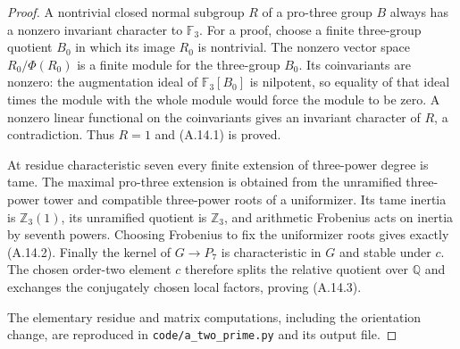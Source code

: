 \begin{proof}
A nontrivial closed normal subgroup $R$ of a pro-three group $B$
always has a nonzero invariant character to $\mathbb F_3$.
For a proof, choose a finite three-group quotient $B_0$ in
which its image $R_0$ is nontrivial. The nonzero vector space
$R_0/\Phi(R_0)$ is a finite module for the three-group $B_0$.
Its coinvariants are nonzero: the augmentation ideal of
$\mathbb F_3[B_0]$ is nilpotent, so equality of that ideal times
the module with the whole module would force the module to be
zero. A nonzero linear functional on the coinvariants gives
an invariant character of $R$, a contradiction. Thus $R=1$
and (A.14.1) is proved.

At residue characteristic seven every finite extension of
three-power degree is tame. The maximal pro-three extension
is obtained from the unramified three-power tower and compatible
three-power roots of a uniformizer. Its tame inertia is
$\mathbb Z_3(1)$, its unramified quotient is $\mathbb Z_3$,
and arithmetic Frobenius acts on inertia by seventh powers.
Choosing Frobenius to fix the uniformizer roots gives exactly
(A.14.2). Finally the kernel of $G\to P_7$ is characteristic
in $G$ and stable under $c$. The chosen order-two element $c$
therefore splits the relative quotient over $\mathbb Q$ and
exchanges the conjugately chosen local factors, proving
(A.14.3).

The elementary residue and matrix computations, including the
orientation change, are reproduced in
\texttt{code/a\_two\_prime.py} and its output file.
\end{proof}

